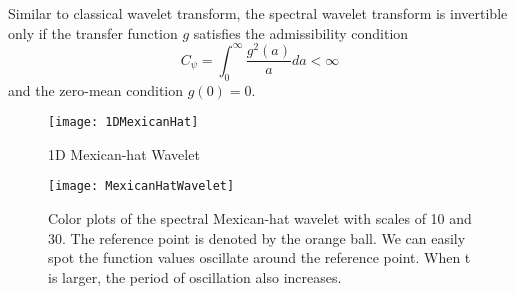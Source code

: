 Similar to classical wavelet transform, the spectral wavelet transform is invertible only if the transfer function $g$ satisfies the admissibility condition
\begin{equation}
C_\psi=\int_0^\infty\frac{g^2(a)}{a}da<\infty
\end{equation}
and the zero-mean condition $g(0)=0$.



\begin{figure}
  \centering
  \texttt{[image: 1DMexicanHat]}\\
  \caption{1D Mexican-hat Wavelet}
  \label{fg:1DMexicanHat}
\end{figure}

\begin{figure}
  \centering
  \texttt{[image: MexicanHatWavelet]}\\
  \caption[Color plots of the spectral Mexican-hat wavelets.]
  {Color plots of the spectral Mexican-hat wavelet with scales of 10 and 30. The reference point is denoted by the orange ball. We can easily spot the function values oscillate around the reference point. When t is larger, the period of oscillation also increases.}
  \label{fg:MexicanHatWavelet}
\end{figure}

